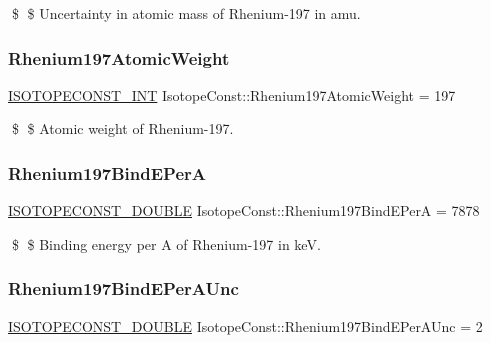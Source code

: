 \$ \$ Uncertainty in atomic mass of Rhenium-\/197 in amu. \mbox{\label{group___isotope_const-_rhenium-_re197_ga598195b08330ed16c3b324b9c0c67c18}} 
\subsubsection{\texorpdfstring{Rhenium197\+Atomic\+Weight}{Rhenium197AtomicWeight}}
{\footnotesize\ttfamily \mbox{\hyperlink{group___isotope_const-_macros_ga5f18360b3e99483a35c32d789e62621c}{I\+S\+O\+T\+O\+P\+E\+C\+O\+N\+S\+T\+\_\+\+I\+NT}} Isotope\+Const\+::\+Rhenium197\+Atomic\+Weight = 197}

\$ \$ Atomic weight of Rhenium-\/197. \mbox{\label{group___isotope_const-_rhenium-_re197_ga337e77c6e296005f68207e9c4ef2cd4d}} 
\subsubsection{\texorpdfstring{Rhenium197\+Bind\+E\+PerA}{Rhenium197BindEPerA}}
{\footnotesize\ttfamily \mbox{\hyperlink{group___isotope_const-_macros_ga8f45a7272ce02c0b4c65c44636ed719a}{I\+S\+O\+T\+O\+P\+E\+C\+O\+N\+S\+T\+\_\+\+D\+O\+U\+B\+LE}} Isotope\+Const\+::\+Rhenium197\+Bind\+E\+PerA = 7878}

\$ \$ Binding energy per A of Rhenium-\/197 in keV. \mbox{\label{group___isotope_const-_rhenium-_re197_gab4f36bb4bf0c2a10b34d8a347ddba1e0}} 
\subsubsection{\texorpdfstring{Rhenium197\+Bind\+E\+Per\+A\+Unc}{Rhenium197BindEPerAUnc}}
{\footnotesize\ttfamily \mbox{\hyperlink{group___isotope_const-_macros_ga8f45a7272ce02c0b4c65c44636ed719a}{I\+S\+O\+T\+O\+P\+E\+C\+O\+N\+S\+T\+\_\+\+D\+O\+U\+B\+LE}} Isotope\+Const\+::\+Rhenium197\+Bind\+E\+Per\+A\+Unc = 2}

